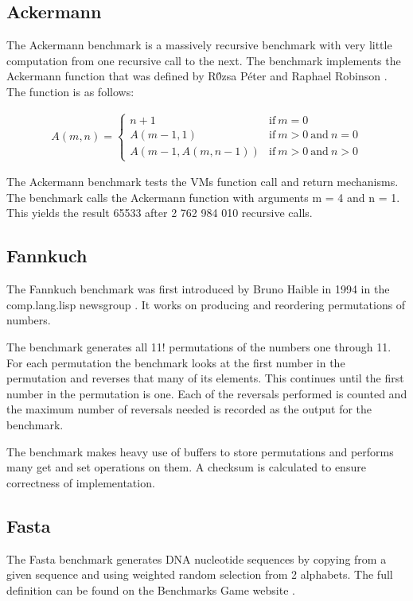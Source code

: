 \documentclass[english,a4paper,12pt]{report}
\begin{document}
\subsection{Ackermann}

The Ackermann benchmark is a massively recursive benchmark with very
little computation from one recursive call to the next. The benchmark
implements the Ackermann function that was defined by R\'{0}zsa P\'{e}ter and
Raphael Robinson \cite{robinson1948}. The function is as follows:

\begin{align*}
\label{eq:ackermann}
A (m, n) = \left\{
\begin{array}{ll}
n + 1          &  \mathrm{if}\ m = 0 \\
A (m - 1, 1)   &  \mathrm{if }\ m > 0 \mathrm{\ and\ } n = 0 \\
A (m - 1, A (m, n - 1))   & \mathrm{if}\ m > 0 \mathrm{\  and\  } n > 0 
\end{array}
\right.
\end{align*}

The Ackermann benchmark tests the VMs function call and return
mechanisms. The benchmark calls the Ackermann function with arguments
m = 4 and n = 1. This yields the result 65533 after 2 762 984 010
recursive calls.

\subsection{Fannkuch}

The Fannkuch benchmark was first introduced by Bruno Haible in 1994 in
the comp.lang.lisp newsgroup \cite{fannkuch}. It works on producing
and reordering permutations of numbers.

The benchmark generates all 11! permutations of the numbers one
through 11. For each permutation the benchmark looks at the first
number in the permutation and reverses that many of its elements. This
continues until the first number in the permutation is one. Each of
the reversals performed is counted and the maximum number of reversals
needed is recorded as the output for the benchmark.

The benchmark makes heavy use of buffers to store permutations and
performs many get and set operations on them. A checksum is calculated
to ensure correctness of implementation.

\subsection{Fasta}
The Fasta benchmark generates DNA nucleotide sequences by copying from
a given sequence and using weighted random selection from 2
alphabets. The full definition can be found on the Benchmarks Game
website \cite{fasta}.
\end{document}
